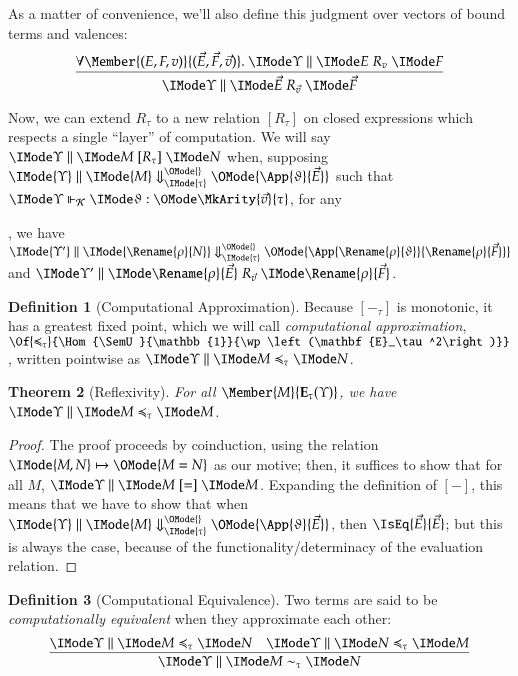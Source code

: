 \documentclass[11pt]{article}
\newtheorem{thm}{Theorem}[section]
\theoremstyle{definition}
\newtheorem{definition}[thm]{Definition}
\theoremstyle{notation}
\theoremstyle{remark}
\numberwithin{equation}{section}
\newcommand\Pow[1]{\wp\left(#1\right)}
\newcommand\EvalN[5]{\IMode{#1}\parallel\IMode{#4}\Downarrow^{\OMode{#3}}_{\IMode{#2}}\OMode{#5}}
\newcommand\Eval[4]{\EvalN{#1}{#2}{}{#3}{#4}}
\newcommand\Exprs{\mathbf{E}}
\begin{document}
As a matter of convenience, we'll also define this judgment over vectors of
bound terms and valences:
\[
  \infer{
    \PBinRel{R_{\vec{v}}}{\Upsilon}{\vec{E}}{\vec{F}}
  }{
    \forall\Member{(E,F,v)}{(\vec{E},\vec{F},\vec{v})}.\
    \PBinRel{R_v}{\Upsilon}{E}{F}
  }
\]

Now, we can extend $R_\tau$ to a new relation $[R_\tau]$ on closed expressions
which respects a single ``layer'' of computation. We will say
$\PBinRel{[R_\tau]}{\Upsilon}{M}{N}$ when, supposing
$\Eval{\Upsilon}{\tau}{M}{\App{\vartheta}{\Vec{E}}}$ such that
$\IsCanOperator{\Upsilon}{\vartheta}{\MkArity{\vec{v}}{\tau}}$,
for any
, we have $\Eval{\Upsilon'}{\tau}{\Rename{\rho}{N}}{\App{\Rename{\rho}{\vartheta}}{\Rename{\rho}{\Vec{F}}}}$ and
$\PBinRel{R_{\vec{v}}}{\Upsilon'}{\Rename{\rho}{\vec{E}}}{\Rename{\rho}{\vec{F}}}$.

\begin{definition}[Computational Approximation]
  Because $[-_\tau]$ is monotonic, it has a greatest fixed point, which we will
  call \emph{computational approximation},
  $\Of{\preccurlyeq_\tau}{\Hom{\SemU}{\mathbb{1}}{\Pow{\Exprs_\tau^2}}}$,
  written pointwise as $\PBinRel{\preccurlyeq_\tau}{\Upsilon}{M}{N}$.
\end{definition}

\begin{thm}[Reflexivity]\label{thm:approx-refl}
  For all $\Member{M}{\Exprs_\tau(\Upsilon)}$, we have $\PBinRel{\preccurlyeq_\tau}{\Upsilon}{M}{M}$.
\end{thm}
\begin{proof}
  The proof proceeds by coinduction, using the relation
  $\IMode{M,N}\mapsto\OMode{M = N}$ as our motive; then, it suffices to show
  that for all $M$, $\PBinRel{[=]}{\Upsilon}{M}{M}$. Expanding the definition
  of $[-]$, this means that we have to show that when
  $\Eval{\Upsilon}{\tau}{M}{\App{\vartheta}{\vec{E}}}$, then
  $\IsEq{\vec{E}}{\vec{E}}$; but this is always the case, because of the
  functionality/determinacy of the evaluation relation.
\end{proof}

\begin{definition}[Computational Equivalence]
  Two terms are said to be \emph{computationally equivalent} when they approximate each other:
  \[
    \infer{
      \PBinRel{\sim_\tau}{\Upsilon}{M}{N}
    }{
      \PBinRel{\preccurlyeq_\tau}{\Upsilon}{M}{N} &
      \PBinRel{\preccurlyeq_\tau}{\Upsilon}{N}{M}
    }
  \]
\end{definition}
\end{document}
